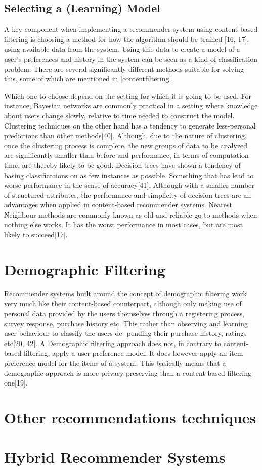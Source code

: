 \subsection{Selecting a (Learning) Model}\label{trainingmodel}
A key component when implementing a recommender system using content-based filtering is choosing a method for how the algorithm should be trained [16, 17], using available data from the system. Using this data to create a model of a user’s preferences and history in the system can be seen as a kind of classification problem. There are several significantly different methods suitable for solving this, some of which are mentioned in \autoref{contentfiltering}.

Which one to choose depend on the setting for which it is going to be used. For instance, Bayesian networks are commonly practical in a setting where knowledge about users change slowly, relative to time needed to construct the model. Clustering techniques on the other hand has a tendency to generate less-personal predictions than other methods[40]. Although, due to the nature of clustering, once the clustering process is complete, the new groups of data to be analyzed are significantly smaller than before and performance, in terms of computation time, are thereby likely to be good. Decision trees have shown a tendency of basing classifications on as few instances as possible. Something that has lead to worse performance in the sense of accuracy[41]. Although with a smaller number of structured attributes, the performance and simplicity of decision trees are all advantages when applied in content-based recommender systems. Nearest Neighbour methods are commonly known as old and reliable go-to methods when nothing else works. It has the worst performance in most cases, but are most likely to succeed[17].

\section{Demographic Filtering}
Recommender systems built around the concept of demographic filtering work very much like their content-based counterpart, although only making use of personal data provided by the users themselves through a registering process, survey response, purchase history
etc. This rather than observing and learning user behaviour to classify the users de-
pending their purchase history, ratings etc[20, 42]. A Demographic filtering approach
does not, in contrary to content-based filtering, apply a user preference model. It does
however apply an item preference model for the items of a system. This basically means
that a demographic approach is more privacy-preserving than a content-based filtering
one[19].

\section{Other recommendations techniques}

\section{Hybrid Recommender Systems}



